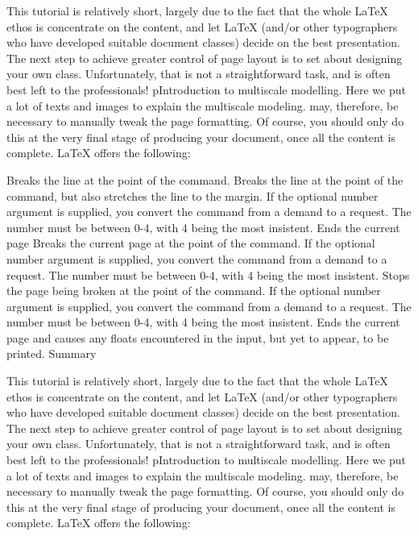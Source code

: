 \documentclass[a0paper]{article}
\begin{document}
\begin{multicols}{3}
This tutorial is relatively short, largely due to the fact that the whole LaTeX
ethos is concentrate on the content, and let LaTeX (and/or other typographers
who have developed suitable document classes) decide on the best presentation.
The next step to achieve greater control of page layout is to set about
designing your own class. Unfortunately, that is not a straightforward task, and
is often best left to the professionals! 
pIntroduction to multiscale modelling. Here we put a lot of texts and images to
explain the multiscale modeling.  may, therefore, be necessary to manually tweak
the page formatting. Of course, you should only do this at the very final stage
of producing your document, once all the content is complete. LaTeX offers the
following:


Breaks the line at the point of the command.  Breaks the line at the point of
the command, but also stretches the line to the margin. If the optional number
argument is supplied, you convert the command from a demand to a request. The
number must be between 0-4, with 4 being the most insistent.  Ends the current
page Breaks the current page at the point of the command. If the optional number
argument is supplied, you convert the command from a demand to a request. The
number must be between 0-4, with 4 being the most insistent.  Stops the page
being broken at the point of the command. If the optional number argument is
supplied, you convert the command from a demand to a request. The number must be
between 0-4, with 4 being the most insistent.  Ends the current page and causes
any floats encountered in the input, but yet to appear, to be printed.  Summary

This tutorial is relatively short, largely due to the fact that the whole LaTeX
ethos is concentrate on the content, and let LaTeX (and/or other typographers
who have developed suitable document classes) decide on the best presentation.
The next step to achieve greater control of page layout is to set about
designing your own class. Unfortunately, that is not a straightforward task, and
is often best left to the professionals! 
pIntroduction to multiscale modelling. Here we put a lot of texts and images to
explain the multiscale modeling.  may, therefore, be necessary to manually tweak
the page formatting. Of course, you should only do this at the very final stage
of producing your document, once all the content is complete. LaTeX offers the
following:



\end{multicols}
\end{document}

